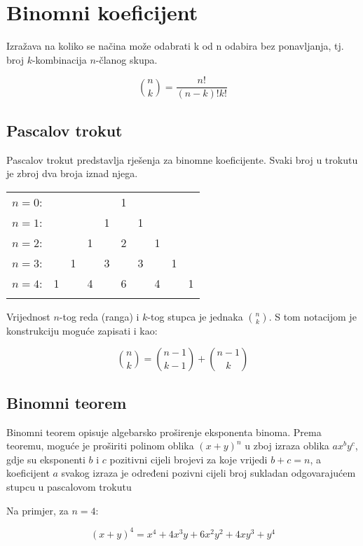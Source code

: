 \section{Binomni koeficijent}

Izražava na koliko se načina može odabrati k od n odabira bez ponavljanja, tj.
broj $k$-kombinacija $n$-članog skupa.

$$
\binom{n}{k} = \frac{n!}{(n-k)!k!}
$$

\subsection{Pascalov trokut}

Pascalov trokut predstavlja rješenja za binomne koeficijente. Svaki broj u
trokutu je zbroj dva broja iznad njega.

\begin{tabular}{rccccccccc}
    $n=0$:&    &    &    &    &  1\\\noalign{\smallskip\smallskip}
    $n=1$:&    &    &    &  1 &    &  1\\\noalign{\smallskip\smallskip}
    $n=2$:&    &    &  1 &    &  2 &    &  1\\\noalign{\smallskip\smallskip}
    $n=3$:&    &  1 &    &  3 &    &  3 &    &  1\\\noalign{\smallskip\smallskip}
    $n=4$:&  1 &    &  4 &    &  6 &    &  4 &    &  1\\\noalign{\smallskip\smallskip}
\end{tabular}

Vrijednost $n$-tog reda (ranga) i $k$-tog stupca je jednaka $\binom{n}{k}$. S
tom notacijom je konstrukciju moguće zapisati i kao:

$$
\binom{n}{k} = \binom{n-1}{k-1} + \binom{n-1}{k}
$$

\subsection{Binomni teorem}

Binomni teorem opisuje algebarsko proširenje eksponenta binoma. Prema teoremu,
moguće je proširiti polinom oblika $(x+y)^n$ u zboj izraza oblika $ax^by^c$,
gdje su eksponenti $b$ i $c$ pozitivni cijeli brojevi za koje vrijedi $b+c=n$, a
koeficijent $a$ svakog izraza je određeni pozivni cijeli broj sukladan
odgovarajućem stupcu u pascalovom trokutu

Na primjer, za $n=4$:

$$
(x+y)^4=x^4+4x^3y+6x^2y^2+4xy^3+y^4
$$

